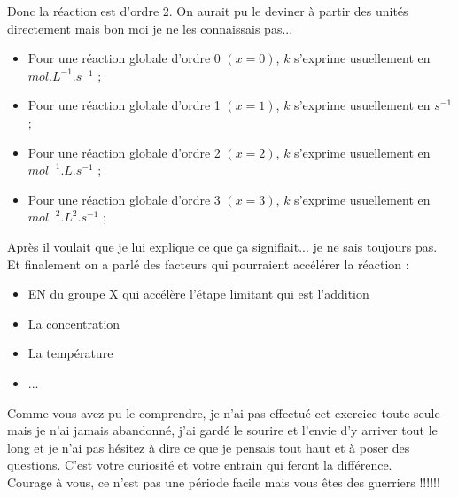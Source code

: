 Donc la réaction est d’ordre 2. On aurait pu le deviner à partir des unités directement mais bon moi je ne les connaissais pas...


\begin{itemize}
    \item Pour une réaction globale d'ordre 0 $(x=0)$, $k$ s'exprime usuellement en $mol.L^{-1}.s^{-1}$ ;
    \item Pour une réaction globale d'ordre 1 $(x=1)$, $k$ s'exprime usuellement en $s^{-1}$ ;
    \item Pour une réaction globale d'ordre 2 $(x=2)$, $k$ s'exprime usuellement en $mol^{-1}.L.s^{-1}$ ;
    \item Pour une réaction globale d'ordre 3 $(x=3)$, $k$ s'exprime usuellement en $mol^{-2}.L^{2}.s^{-1}$ ;
\end{itemize}


Après il voulait que je lui explique ce que ça signifiait... je ne sais toujours pas.\\

Et finalement on a parlé des facteurs qui pourraient accélérer la réaction :
\begin{itemize}
    \item EN du groupe X qui accélère l’étape limitant qui est l’addition
    \item La concentration
    \item La température
    \item ...
\end{itemize}

Comme vous avez pu le comprendre, je n’ai pas effectué cet exercice toute seule mais je n’ai jamais abandonné, j’ai gardé le sourire et l’envie d’y arriver tout le long et je n’ai pas hésitez à dire ce que je pensais tout haut et à poser des questions. C’est votre curiosité et votre entrain qui feront la différence.\\

Courage à vous, ce n’est pas une période facile mais vous êtes des guerriers !!!!!!
\vspace{1cm}

